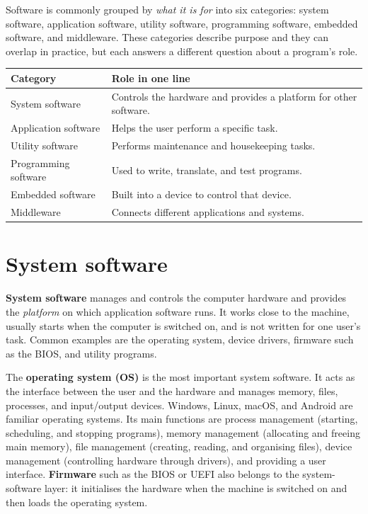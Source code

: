 \documentclass[11pt]{article}
\begin{document}
Software is commonly grouped by \emph{what it is for} into six categories:
system software, application software, utility software, programming
software, embedded software, and middleware. These categories describe purpose
and they can overlap in practice, but each answers a different question about
a program's role.

\begin{center}
\begin{tabular}{p{}p{}}
\toprule
\textbf{Category} & \textbf{Role in one line} \\
\midrule
System software & Controls the hardware and provides a platform for other software. \\
Application software & Helps the user perform a specific task. \\
Utility software & Performs maintenance and housekeeping tasks. \\
Programming software & Used to write, translate, and test programs. \\
Embedded software & Built into a device to control that device. \\
Middleware & Connects different applications and systems. \\
\bottomrule
\end{tabular}
\end{center}

\section{System software}
\textbf{System software} manages and controls the computer hardware and
provides the \emph{platform} on which application software runs. It works
close to the machine, usually starts when the computer is switched on, and is
not written for one user's task. Common examples are the operating system,
device drivers, firmware such as the BIOS, and utility programs.

The \textbf{operating system (OS)} is the most important system software. It
acts as the interface between the user and the hardware and manages memory,
files, processes, and input/output devices. Windows, Linux, macOS, and Android
are familiar operating systems. Its main functions are process management
(starting, scheduling, and stopping programs), memory management (allocating
and freeing main memory), file management (creating, reading, and organising
files), device management (controlling hardware through drivers), and
providing a user interface. \textbf{Firmware} such as the BIOS or UEFI also
belongs to the system-software layer: it initialises the hardware when the
machine is switched on and then loads the operating system.
\end{document}
